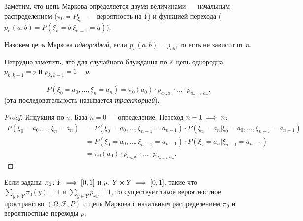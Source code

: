 Заметим, что цепь Маркова определяется двумя величинами --- начальным распределением ($\pi_0 = P_{\xi_0}$ ~--- вероятность на $Y$) и функцией перехода ($p_n(a, b) = P(\xi_n = b | \xi_{n - 1} = a)$).


\begin{definition}
    Назовем цепь Маркова \textit{однородной}, если $p_n(a, b) = p_{ab}$, то есть не зависит от $n$.
\end{definition}

   Нетрудно заметить, что для случайного блуждания по $\mathbb{Z}$ цепь однородна, $p_{k, k + 1} = p$ и $p_{k, k - 1} = 1-p$.

\begin{theorem}
    $$P(\xi_0 = a_0, \ldots, \xi_n = a_n) = \pi_0(a_0)\cdot p_{a_0, a_1}\cdot\ldots\cdot p_{a_{n - 1}, a_n}.$$ (эта последовательность называется \textit{траекторией}).
\end{theorem}

\begin{proof}
    Индукция по $n$.
    База $n=0$ --- определение.
    Переход $n - 1\implies n$:
   \begin{align*}
       P(\xi_0 = a_0, \ldots, \xi_n = a_n) &= P(\xi_0 = a_0 , \ldots, \xi_{n - 1} = a_{n - 1})\cdot P(\xi_n = a_n | \xi_0 = a_0, \ldots, \xi_{n - 1} =
        a_{n - 1}) \\&= P(\xi_0 = a_0 , \ldots, \xi_{n - 1} = a_{n - 1})\cdot P(\xi_n = a_n | \xi_{n - 1} = a_{n - 1})  \\&=
        \pi_0(a_0)\cdot p_{a_0, a_1}\cdot\ldots\cdot p_{a_{n - 1}, a_n}.
   \end{align*}
\end{proof}

\begin{theorem}
    Если заданы $\pi_0\colon Y \implies [0, 1]$ и $p\colon Y\times Y \implies [0,1]$, такие что $\sum_{y\in Y}\pi_0(y) = 1$ и
    $\sum_{y\in Y} p_{xy} = 1$, то существует такое вероятностное пространство $(\Omega, \mathcal{F}, P)$ и цепь Маркова
    с начальным распределением $\pi_0$ и вероятностные переходы $p$.
\end{theorem}
